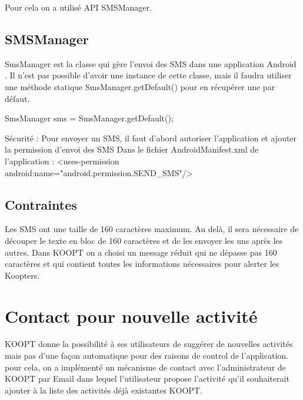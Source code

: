 Pour cela on a utilisé API SMSManager.

\subsection{SMSManager}
SmsManager est la classe qui  gère l’envoi des  SMS dans une application Android . Il n'est pas possible d'avoir une instance de cette classe, mais il faudra utiliser une méthode statique SmsManager.getDefault() pour en récupérer une par défaut.

SmsManager sms = SmsManager.getDefault();

Sécurité : 
Pour envoyer un SMS, il faut d'abord autoriser l'application et ajouter la permission d’envoi des SMS Dans le fichier AndroidManifest.xml de l’application :
<uses-permission android:name="android.permission.SEND\_SMS"/>
\subsection{Contraintes}
Les SMS ont une taille de 160 caractères maximum. Au delà, il sera nécessaire de découper le texte en bloc de 160 caractères et de les envoyer les uns après les autres.
Dans KOOPT on a choisi un message réduit qui ne dépasse pas 160 caractères et qui contient toutes les informations nécessaires pour alerter les Koopters.

\section{Contact pour nouvelle activité}

KOOPT donne la possibilité à ses utilisateurs de suggérer de nouvelles activités mais pas d’une façon automatique pour des raisons de control de l’application. pour cela, on a implémenté un mécanisme de contact avec l’administrateur de KOOPT par Email dans lequel l’utilisateur propose l’activité qu’il souhaiterait ajouter à la liste des activités déjà existantes KOOPT.

